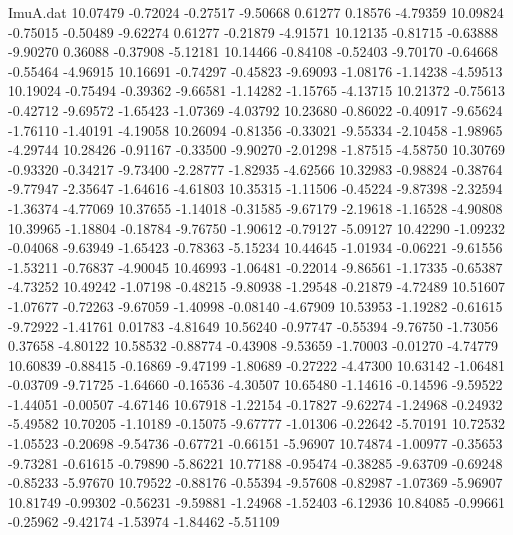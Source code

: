 \begin{filecontents}{ImuA.dat}
  10.07479   -0.72024   -0.27517   -9.50668    0.61277    0.18576   -4.79359
  10.09824   -0.75015   -0.50489   -9.62274    0.61277   -0.21879   -4.91571
  10.12135   -0.81715   -0.63888   -9.90270    0.36088   -0.37908   -5.12181
  10.14466   -0.84108   -0.52403   -9.70170   -0.64668   -0.55464   -4.96915
  10.16691   -0.74297   -0.45823   -9.69093   -1.08176   -1.14238   -4.59513
  10.19024   -0.75494   -0.39362   -9.66581   -1.14282   -1.15765   -4.13715
  10.21372   -0.75613   -0.42712   -9.69572   -1.65423   -1.07369   -4.03792
  10.23680   -0.86022   -0.40917   -9.65624   -1.76110   -1.40191   -4.19058
  10.26094   -0.81356   -0.33021   -9.55334   -2.10458   -1.98965   -4.29744
  10.28426   -0.91167   -0.33500   -9.90270   -2.01298   -1.87515   -4.58750
  10.30769   -0.93320   -0.34217   -9.73400   -2.28777   -1.82935   -4.62566
  10.32983   -0.98824   -0.38764   -9.77947   -2.35647   -1.64616   -4.61803
  10.35315   -1.11506   -0.45224   -9.87398   -2.32594   -1.36374   -4.77069
  10.37655   -1.14018   -0.31585   -9.67179   -2.19618   -1.16528   -4.90808
  10.39965   -1.18804   -0.18784   -9.76750   -1.90612   -0.79127   -5.09127
  10.42290   -1.09232   -0.04068   -9.63949   -1.65423   -0.78363   -5.15234
  10.44645   -1.01934   -0.06221   -9.61556   -1.53211   -0.76837   -4.90045
  10.46993   -1.06481   -0.22014   -9.86561   -1.17335   -0.65387   -4.73252
  10.49242   -1.07198   -0.48215   -9.80938   -1.29548   -0.21879   -4.72489
  10.51607   -1.07677   -0.72263   -9.67059   -1.40998   -0.08140   -4.67909
  10.53953   -1.19282   -0.61615   -9.72922   -1.41761    0.01783   -4.81649
  10.56240   -0.97747   -0.55394   -9.76750   -1.73056    0.37658   -4.80122
  10.58532   -0.88774   -0.43908   -9.53659   -1.70003   -0.01270   -4.74779
  10.60839   -0.88415   -0.16869   -9.47199   -1.80689   -0.27222   -4.47300
  10.63142   -1.06481   -0.03709   -9.71725   -1.64660   -0.16536   -4.30507
  10.65480   -1.14616   -0.14596   -9.59522   -1.44051   -0.00507   -4.67146
  10.67918   -1.22154   -0.17827   -9.62274   -1.24968   -0.24932   -5.49582
  10.70205   -1.10189   -0.15075   -9.67777   -1.01306   -0.22642   -5.70191
  10.72532   -1.05523   -0.20698   -9.54736   -0.67721   -0.66151   -5.96907
  10.74874   -1.00977   -0.35653   -9.73281   -0.61615   -0.79890   -5.86221
  10.77188   -0.95474   -0.38285   -9.63709   -0.69248   -0.85233   -5.97670
  10.79522   -0.88176   -0.55394   -9.57608   -0.82987   -1.07369   -5.96907
  10.81749   -0.99302   -0.56231   -9.59881   -1.24968   -1.52403   -6.12936
  10.84085   -0.99661   -0.25962   -9.42174   -1.53974   -1.84462   -5.51109

\end{filecontents}
